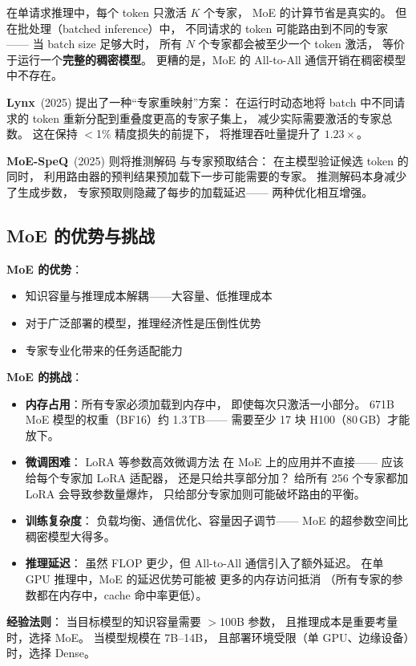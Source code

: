 在单请求推理中，每个 token 只激活 $K$ 个专家，
MoE 的计算节省是真实的。
但在批处理（batched inference）中，
不同请求的 token 可能路由到不同的专家——
当 batch size 足够大时，
所有 $N$ 个专家都会被至少一个 token 激活，
等价于运行一个\textbf{完整的稠密模型}。
更糟的是，MoE 的 All-to-All 通信开销在稠密模型中不存在。

\textbf{Lynx}~(2025) 提出了一种``专家重映射''方案：%
在运行时动态地将 batch 中不同请求的 token
重新分配到重叠度更高的专家子集上，
减少实际需要激活的专家总数。
这在保持 $<$1\% 精度损失的前提下，
将推理吞吐量提升了 $1.23\times$。

\textbf{MoE-SpeQ}~(2025) 则将推测解码%
与专家预取结合：
在主模型验证候选 token 的同时，
利用路由器的预判结果预加载下一步可能需要的专家。
推测解码本身减少了生成步数，
专家预取则隐藏了每步的加载延迟——
两种优化相互增强。

\subsection{MoE 的优势与挑战}

\begin{corebox}
\textbf{MoE 的优势}：
\begin{itemize}[noitemsep]
  \item 知识容量与推理成本解耦——大容量、低推理成本
  \item 对于广泛部署的模型，推理经济性是压倒性优势
  \item 专家专业化带来的任务适配能力
\end{itemize}

\textbf{MoE 的挑战}：
\begin{itemize}[noitemsep]
  \item \textbf{内存占用}：所有专家必须加载到内存中，
        即使每次只激活一小部分。
        671B MoE 模型的权重（BF16）约 1.3\,TB——
        需要至少 17 块 H100（80\,GB）才能放下。
  \item \textbf{微调困难}：
        LoRA 等参数高效微调方法
        在 MoE 上的应用并不直接——
        应该给每个专家加 LoRA 适配器，
        还是只给共享部分加？
        给所有 256 个专家都加 LoRA 会导致参数量爆炸，
        只给部分专家加则可能破坏路由的平衡。
  \item \textbf{训练复杂度}：
        负载均衡、通信优化、容量因子调节——
        MoE 的超参数空间比稠密模型大得多。
  \item \textbf{推理延迟}：
        虽然 FLOP 更少，但 All-to-All 通信引入了额外延迟。
        在单 GPU 推理中，MoE 的延迟优势可能被
        更多的内存访问抵消
        （所有专家的参数都在内存中，cache 命中率更低）。
\end{itemize}

\textbf{经验法则}：
当目标模型的知识容量需要 $>$100B 参数，
且推理成本是重要考量时，选择 MoE。
当模型规模在 7B--14B，
且部署环境受限（单 GPU、边缘设备）时，选择 Dense。
\end{corebox}

